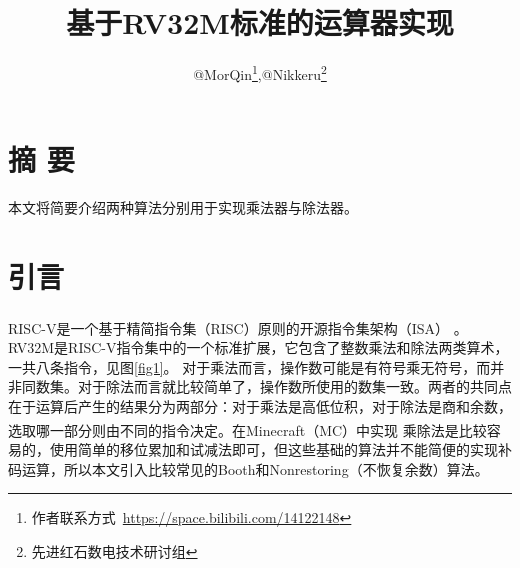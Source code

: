 \documentclass[UTF8,12pt,punct=kaiming,fontset=none]{article}
\title{\vspace{-1.5cm}基于RV32M标准的运算器实现\vspace{-0.5cm}}
\author{@MorQin\thanks{作者联系方式~\url{https://space.bilibili.com/14122148}},@Nikkeru\thanks{先进红石数电技术研讨组}}
\date{}
\newcommand*{\upcite}[1]{
    \textsuperscript{\cite{#1}}
}
\begin{document}
    \maketitle
    \thispagestyle{fancy} %
    \vspace{-0.7cm}

    \begin{minipage}[c]{0.75\linewidth}
        \titleformat{\section}[wrap]{\sffamily\small\bfseries}{}{0cm}{}
        \titlespacing{\section}{2cm}{1ex}{0.4cm}

        \section{摘 \hspace{0.11cm} 要}
        \small 本文将简要介绍两种算法分别用于实现乘法器与除法器。%

    \end{minipage}
    \vspace{0.2cm}

    \titleformat{\section}[hang]{\large\sffamily\bfseries}{\textmd{\thesection}}{0.5cm}{}
    \titlespacing{\section}{0cm}{0.5ex}{0.2ex}
    \setcounter{section}{-1}

    \section{引言}
    RISC-V是一个基于精简指令集（RISC）原则的开源指令集架构（ISA）\upcite{patterson2017risc}。
    RV32M是RISC-V指令集中的一个标准扩展，它包含了整数乘法和除法两类算术，一共八条指令，见图\ref{fig1}。
    对于乘法而言，操作数可能是有符号乘无符号，而并非同数集。对于除法而言就比较简单了，操作数所使用的数集一致。两者的共同点在于运算后产生的结果分为两部分：对于乘法是高低位积，对于除法是商和余数，选取哪一部分则由不同的指令决定。在Minecraft（MC）中实现\upcite{RLC}乘除法是比较容易的，使用简单的移位累加和试减法即可，但这些基础的算法并不能简便的实现补码运算，所以本文引入比较常见的Booth和Nonrestoring（不恢复余数）算法。
\end{document}
